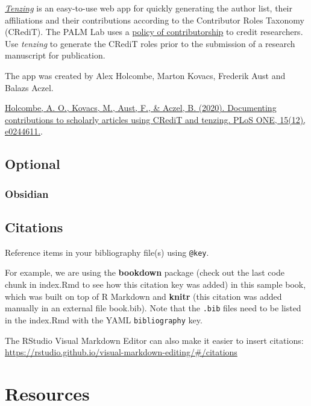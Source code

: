 \documentclass[
]{book}
\theoremstyle{definition}
\theoremstyle{definition}
\theoremstyle{definition}
\theoremstyle{definition}
\theoremstyle{remark}
\begin{document}
\href{https://tenzing.club}{\emph{Tenzing}} is an easy-to-use web app for quickly generating the author list, their affiliations and their contributions according to the Contributor Roles Taxonomy (CRediT). The PALM Lab uses a \protect\hyperlink{contributorship}{policy of contributorship} to credit researchers. Use \emph{tenzing} to generate the CRediT roles prior to the submission of a research manuscript for publication.

The app was created by Alex Holcombe, Marton Kovacs, Frederik Aust and Balazs Aczel.

\href{https://journals.plos.org/plosone/article?id=10.1371/journal.pone.0244611}{Holcombe, A. O., Kovacs, M., Aust, F., \& Aczel, B. (2020). Documenting contributions to scholarly articles using CRediT and tenzing. PLoS ONE, 15(12), e0244611.}.

\hypertarget{optional}{%
\section{Optional}\label{optional}}

\hypertarget{obsidian}{%
\subsection{Obsidian}\label{obsidian}}

\hypertarget{citations}{%
\section{Citations}\label{citations}}

Reference items in your bibliography file(s) using \texttt{@key}.

For example, we are using the \textbf{bookdown} package \citep{R-bookdown} (check out the last code chunk in index.Rmd to see how this citation key was added) in this sample book, which was built on top of R Markdown and \textbf{knitr} \citep{xie2015} (this citation was added manually in an external file book.bib).
Note that the \texttt{.bib} files need to be listed in the index.Rmd with the YAML \texttt{bibliography} key.

The RStudio Visual Markdown Editor can also make it easier to insert citations: \url{https://rstudio.github.io/visual-markdown-editing/\#/citations}

\hypertarget{resources-1}{%
\chapter{Resources}\label{resources-1}}
\end{document}

